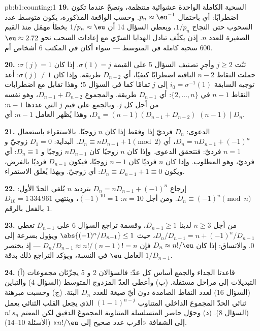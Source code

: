 \begin{solution}{pb:b1:counting:1}
\textbf{19.} السحبة الكاملة الواحدة  عشوائية منتظمة،
وتصحّ عندما تكون اضطرابًا: أي باحتمال $p_n \approx \eu^{-1}$.
وحسب الواقعة المذكورة، يكون متوسط عدد السحوب حتى النجاح
$1/p_n$، ويعطي السؤال 14 أن $1/p_n \approx \eu$ بخطأ
مهمَل منذ القيم الصغيرة للعدد $n$. إذن يكلّف تبادل الهدايا السرّي
مع إعادات السحب نحو $\eu \approx 2.72$ سحبة كاملة في المتوسط
--- سواء أكان في المكتب $6$ أشخاص أم $600$.

\textbf{20.} ثبّت $j \geq 2$ وأجرِ تصنيف السؤال 5 على
القيمة $\sigma(1) = j$. إذا كان $\sigma(j) = 1$: حملت النقاط
$n - 2$ الباقية اضطرابًا كيفيًا، أي $D_{n-2}$ طريقة. وإذا كان
$\sigma(j) \neq 1$: أعد توجيه السابقة $i_0 = \sigma^{-1}(1)$ إلى
$j$ تمامًا كما في السؤال 5؛ وهذا تقابل مع
اضطرابات النقاط $n - 1$ في $\{2, \dots, n\}$: أي $D_{n-1}$
طريقة. والمجموع $D_{n-1} + D_{n-2}$، وهو نفسه من أجل كل $j$. وبالجمع
على قيم $j$ التي عددها $n - 1$: $D_n = (n-1)(D_{n-1} + D_{n-2})$،
وهذا يُظهر العامل $n - 1$: أي $(n-1) \mid D_n$.

\textbf{21.} الدعوى: $D_n$ فرديّ إذا وفقط إذا كان $n$ زوجيًا. بالاستقراء
باستعمال $D_n = nD_{n-1} + (-1)^n$، أي $D_n \equiv nD_{n-1} + 1 \pmod 2$.
البداية: $D_1 = 0$ زوجيّ و $n = 1$ فرديّ: فتتحقق الدعوى. وإذا كان $n$ زوجيًا
كان $nD_{n-1}$ زوجيًا و $D_n \equiv 1$: أي فرديّ، وهو المطلوب. وإذا كان $n$
فرديًا كان $n - 1$ زوجيًا، فيكون $D_{n-1}$ فرديًا بالفرض، ويكون
$D_n \equiv D_{n-1} + 1 \equiv 0$: أي زوجيّ. وبهذا يُغلق الاستقراء.

\textbf{22.} إرجاع $D_n = nD_{n-1} + (-1)^n$ بترديد $n$ يُلغي
الحدّ الأول: $D_n \equiv (-1)^n \pmod n$. ومن أجل $n = 10$:
$(-1)^{10} = 1$، وينتهي $D_{10} = 1\,334\,961$ بالفعل بالرقم
$1$.

\textbf{23.} من أجل $n \geq 3$ لدينا $D_{n-1} \geq 1$، وقسمة
تراجع السؤال 6 على $D_{n-1}$ تعطي $D_n/D_{n-1} = n +
(-1)^n/D_{n-1}$، حيث $\abs{(-1)^n/D_{n-1}} \leq 1$ ويؤول
بسرعة إلى $0$. والاتساق: إذا كان $D_n \approx n!/\eu$ فإن
$D_n/D_{n-1} \approx n!/(n-1)! = n$ --- إذ يختصر العامل $\eu$
في النسبة، ويؤكد التراجع ذلك بدقة
$1/D_{n-1}$.

\textbf{24.} (أ) قاعدتا الجداء والجمع أساس كل عدّ:
فالسؤالان 2 و 5 يجزّئان مجموعات التبديلات إلى مراحل مستقلة.
(ب) وأعطى العدّ المزدوج المتوسط (السؤال 4) والتباين
(السؤال 16) لعدد النقاط الصامدة دون أيّ صيغة للعدد $D_n$ البتة.
(ج) وحسبت مبرهنة ثنائي الحدّ المجموع الداخلي المتناوب
$(1-1)^{n-j}$ الذي يجعل القلب الثنائي يعمل (السؤال 8). (د) وحوّل
حاصر المتسلسلة المتناوبة المجموعَ الدقيق لكن المعتم $n!\,s_n$ إلى
 الشفافة «أقرب عدد صحيح إلى $n!/\eu$» (الأسئلة 10--14).


\end{solution}
